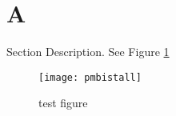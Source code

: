 \section{A}
\label{sect:bg-blocks}
Section Description.  
See Figure \ref{fig:pmbistall} 

\begin{figure}[H]
  \centering
  \texttt{[image: pmbistall]}
  \caption{test figure}
  \label{fig:pmbistall}
\end{figure}




